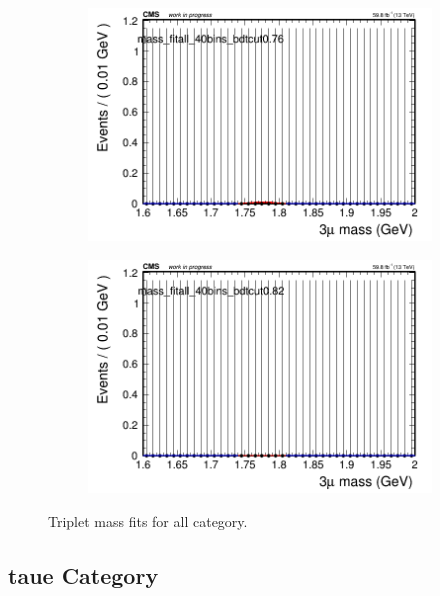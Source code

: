 \begin{figure}[H]
\begin{subfigure}{0.2\textwidth}
        \caption{}
    \end{subfigure}
    \begin{subfigure}{0.2\textwidth}
        \includegraphics[width=\textwidth]{flat_fit/plots/all/massfit_all_40bins_bdtcut0.76.png}
        \caption{}
    \end{subfigure}
    \begin{subfigure}{0.2\textwidth}
        \includegraphics[width=\textwidth]{flat_fit/plots/all/massfit_all_40bins_bdtcut0.82.png}
        \caption{}
    \end{subfigure}
    \caption{Triplet mass fits for all category.}
    \label{fig:flatfitall}
\end{figure}

\subsection{taue Category}
\label{sec:flatfittaue}

